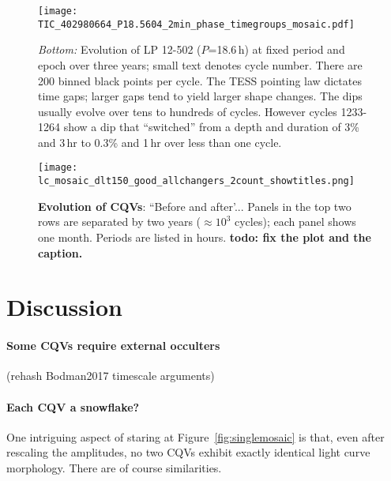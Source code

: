 \documentclass[11pt,twocolumn,tighten]{aastex63}
\begin{document}
\begin{figure*}[!t]
	\begin{center}
    \centering
    \texttt{[image: TIC\_402980664\_P18.5604\_2min\_phase\_timegroups\_mosaic.pdf]}
		\vspace{-0.45cm}
		\caption{
			{\it Bottom:}
      Evolution of LP 12-502 ($P$=18.6\,h) at fixed period and
      epoch over three years; small text denotes cycle number.  
      There are 200 binned black points per cycle.
      The TESS pointing law dictates time gaps; larger gaps tend to
      yield larger shape changes.
      The dips usually evolve over tens to hundreds of cycles.
      However cycles 1233-1264 show a dip that ``switched'' from a depth
      and duration of 3\% and 3\,hr to 0.3\% and 1\,hr over less than
      one cycle.
		}
		\label{fig:lp}
	\end{center}
\end{figure*}


\begin{figure*}[!t]
	\begin{center}
		\centering
		\texttt{[image: lc\_mosaic\_dlt150\_good\_allchangers\_2count\_showtitles.png]}
		\vspace{-0.2cm}
		\caption{
			{\bf Evolution of CQVs}: ``Before and
			after'...  Panels
			in the top two rows are separated by two years
			($\approx$$10^3$ cycles); each panel shows one month.
			Periods are listed in hours. 
			{\bf todo: fix the plot and the caption.}
		}
		\label{fig:evoln}
	\end{center}
\end{figure*}





\section{Discussion}
\label{sec:discussion}

\paragraph{Some CQVs require external occulters}
(rehash Bodman2017 timescale arguments)

\paragraph{Each CQV a snowflake?}
One intriguing aspect of staring at Figure~\ref{fig:singlemosaic}
is that, even after rescaling the amplitudes, no two CQVs
exhibit exactly identical light curve morphology.
There are of course similarities.
\end{document}
